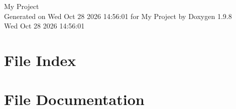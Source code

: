 \documentclass[twoside]{book}
\newcommand{\+}{\discretionary{\mbox{\scriptsize$\hookleftarrow$}}{}{}}
\newcommand{\clearemptydoublepage}{%
    \newpage{\pagestyle{empty}\cleardoublepage}%
  }
\begin{document}
  \raggedbottom
    \hypersetup{pageanchor=false,
                bookmarksnumbered=true,
                pdfencoding=unicode
               }
  \begin{titlepage}
  \vspace*{7cm}
  \begin{center}%
  {\Large My Project}\\
  \vspace*{1cm}
  {\large Generated on Wed Oct 28 2026 14\+:56\+:01 for My Project by Doxygen 1.9.8}\\
    \vspace*{0.5cm}
    {\small Wed Oct 28 2026 14:56:01}
  \end{center}
  \end{titlepage}
  \clearemptydoublepage
  \tableofcontents
  \clearemptydoublepage
  \hypersetup{pageanchor=true}

\chapter{File Index}

\chapter{File Documentation}


  \backmatter
  \newpage
  \clearemptydoublepage
  \printindex
\end{document}
